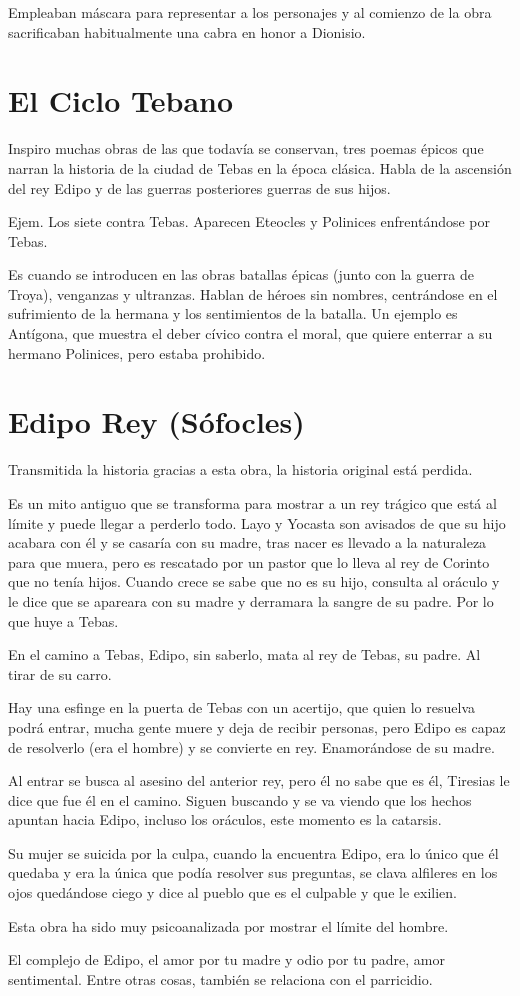 Empleaban máscara para representar a los personajes y al comienzo de la obra sacrificaban habitualmente una cabra en honor a Dionisio.

\section{El Ciclo Tebano}
Inspiro muchas obras de las que todavía se conservan, tres poemas épicos que narran la historia de la ciudad de Tebas en la época clásica. Habla de la ascensión del rey Edipo y de las guerras posteriores guerras de sus hijos.

Ejem. Los siete contra Tebas. Aparecen Eteocles y Polinices enfrentándose por Tebas.

Es cuando se introducen en las obras batallas épicas (junto con la guerra de Troya), venganzas y ultranzas. Hablan de héroes sin nombres, centrándose en el sufrimiento de la hermana y los sentimientos de la batalla. Un ejemplo es Antígona, que muestra el deber cívico contra el moral, que quiere enterrar a su hermano Polinices, pero estaba prohibido.

\section{Edipo Rey (Sófocles)}
Transmitida la historia gracias a esta obra, la historia original está perdida.

Es un mito antiguo que se transforma para mostrar a un rey trágico que está al límite y puede llegar a perderlo todo. Layo y Yocasta son avisados de que su hijo acabara con él y se casaría con su madre, tras nacer es llevado a la naturaleza para que muera, pero es rescatado por un pastor que lo lleva al rey de Corinto que no tenía hijos. Cuando crece se sabe que no es su hijo, consulta al oráculo y le dice que se apareara con su madre y derramara la sangre de su padre. Por lo que huye a Tebas.

En el camino a Tebas, Edipo, sin saberlo, mata al rey de Tebas, su padre. Al tirar de su carro.

Hay una esfinge en la puerta de Tebas con un acertijo, que quien lo resuelva podrá entrar, mucha gente muere y deja de recibir personas, pero Edipo es capaz de resolverlo (era el hombre) y se convierte en rey. Enamorándose de su madre.

Al entrar se busca al asesino del anterior rey, pero él no sabe que es él, Tiresias le dice que fue él en el camino. Siguen buscando y se va viendo que los hechos apuntan hacia Edipo, incluso los oráculos, este momento es la catarsis.

Su mujer se suicida por la culpa, cuando la encuentra Edipo, era lo único que él quedaba y era la única que podía resolver sus preguntas, se clava alfileres en los ojos quedándose ciego y dice al pueblo que es el culpable y que le exilien.

Esta obra ha sido muy psicoanalizada por mostrar el límite del hombre.

El complejo de Edipo, el amor por tu madre y odio por tu padre, amor sentimental. Entre otras cosas, también se relaciona con el parricidio.